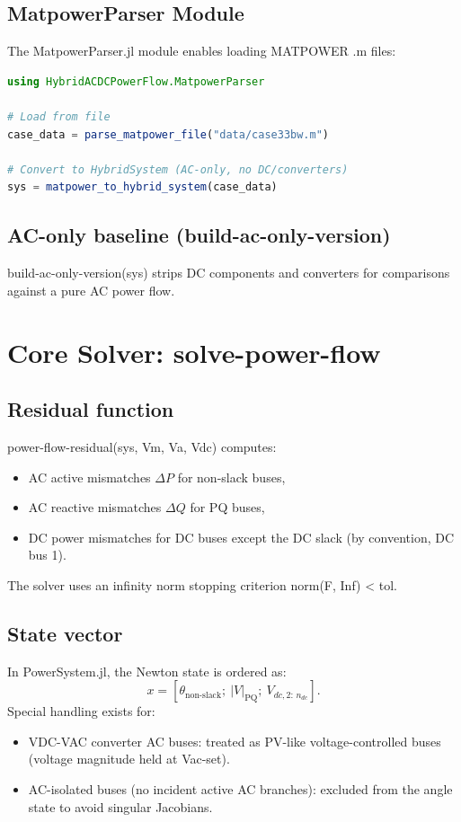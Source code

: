 \documentclass[11pt]{article}
\def\code#1{#1}%
\def\file#1{#1}%
\def\_{-}%
\newcommand{\code}[1]{\nolinkurl{#1}}
\newcommand{\file}[1]{\path{#1}}
\begin{document}
\subsection{MatpowerParser Module}
The \code{MatpowerParser.jl} module enables loading MATPOWER \code{.m} files:
\begin{lstlisting}[language=Julia]
using HybridACDCPowerFlow.MatpowerParser

# Load from file
case_data = parse_matpower_file("data/case33bw.m")

# Convert to HybridSystem (AC-only, no DC/converters)
sys = matpower_to_hybrid_system(case_data)
\end{lstlisting}

\subsection{AC-only baseline (\code{build\_ac\_only\_version})}
\code{build\_ac\_only\_version(sys)} strips DC components and converters for comparisons against a pure AC power flow.

\section{Core Solver: \code{solve\_power\_flow}}\label{sec:core-solver}

\subsection{Residual function}
\code{power\_flow\_residual(sys, Vm, Va, Vdc)} computes:
\begin{itemize}[leftmargin=*]
  \item AC active mismatches $\Delta P$ for non-slack buses,
  \item AC reactive mismatches $\Delta Q$ for PQ buses,
  \item DC power mismatches for DC buses except the DC slack (by convention, DC bus 1).
\end{itemize}
The solver uses an infinity norm stopping criterion \code{norm(F, Inf) < tol}.

\subsection{State vector}
In \file{PowerSystem.jl}, the Newton state is ordered as:
\[
x = [\theta_{\text{non-slack}};\ |V|_{\text{PQ}};\ V_{dc,2:\,n_{dc}}].
\]
Special handling exists for:
\begin{itemize}[leftmargin=*]
  \item \code{VDC\_VAC} converter AC buses: treated as PV-like voltage-controlled buses (voltage magnitude held at \code{Vac\_set}).
  \item AC-isolated buses (no incident active AC branches): excluded from the angle state to avoid singular Jacobians.
\end{itemize}
\end{document}
